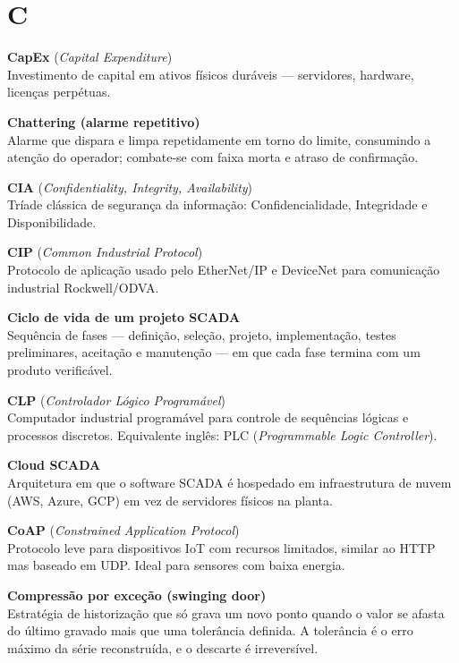 \section{C}\label{c}

\textbf{CapEx} (\emph{Capital Expenditure})\\
Investimento de capital em ativos físicos duráveis --- servidores, hardware, licenças perpétuas.

\textbf{Chattering (alarme repetitivo)}\\
Alarme que dispara e limpa repetidamente em torno do limite, consumindo a atenção do operador; combate-se com faixa morta e atraso de confirmação.

\textbf{CIA} (\emph{Confidentiality, Integrity, Availability})\\
Tríade clássica de segurança da informação: Confidencialidade, Integridade e Disponibilidade.

\textbf{CIP} (\emph{Common Industrial Protocol})\\
Protocolo de aplicação usado pelo EtherNet/IP e DeviceNet para comunicação industrial Rockwell/ODVA.

\textbf{Ciclo de vida de um projeto SCADA}\\
Sequência de fases --- definição, seleção, projeto, implementação, testes preliminares, aceitação e manutenção --- em que cada fase termina com um produto verificável.

\textbf{CLP} (\emph{Controlador Lógico Programável})\\
Computador industrial programável para controle de sequências lógicas e processos discretos. Equivalente inglês: PLC (\emph{Programmable Logic Controller}).

\textbf{Cloud SCADA}\\
Arquitetura em que o software SCADA é hospedado em infraestrutura de nuvem (AWS, Azure, GCP) em vez de servidores físicos na planta.

\textbf{CoAP} (\emph{Constrained Application Protocol})\\
Protocolo leve para dispositivos IoT com recursos limitados, similar ao HTTP mas baseado em UDP. Ideal para sensores com baixa energia.

\textbf{Compressão por exceção (swinging door)}\\
Estratégia de historização que só grava um novo ponto quando o valor se afasta do último gravado mais que uma tolerância definida. A tolerância é o erro máximo da série reconstruída, e o descarte é irreversível.

